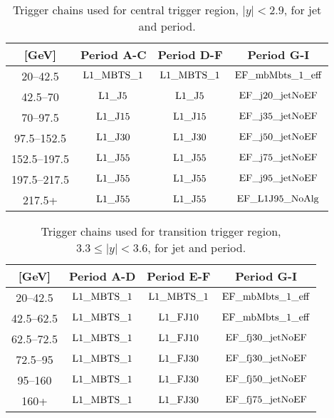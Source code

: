 \begin{table}[htdp]
\centering
\begin{tabular}{ | c | c | c | c | }
  \hline
 \pt{} [GeV] & Period A-C & Period D-F & Period G-I \\
  \hline
20--42.5 &  $ \rm L1\_ MBTS\_ 1$ & $ \rm L1\_ MBTS\_ 1$ & $ \rm EF\_ mbMbts\_ 1\_ eff$  \\
42.5--70 &  $ \rm L1\_ J5$ &     $ \rm L1\_ J5$ &     $ \rm EF\_ j20\_ jetNoEF$  \\
70--97.5 &   $ \rm L1\_ J15$ &    $ \rm L1\_ J15$ &    $ \rm EF\_ j35\_ jetNoEF$  \\
97.5--152.5 &   $ \rm L1\_ J30$ &    $ \rm L1\_ J30$ &    $ \rm EF\_ j50\_ jetNoEF$  \\
152.5--197.5 &  $ \rm L1\_ J55$ &    $ \rm L1\_ J55$ &    $ \rm EF\_ j75\_ jetNoEF$  \\
197.5--217.5 &  $ \rm L1\_ J55$ &    $ \rm L1\_ J55$ &    $ \rm EF\_ j95\_ jetNoEF$  \\
217.5+ &     $ \rm L1\_ J55$ &    $ \rm L1\_ J55$ &    $ \rm EF\_ L1J95\_ NoAlg$ \\

  \hline
\end{tabular}
\caption[Triggers used for jets in the central region]{
Trigger chains used for central trigger region, $|y|<2.9$, for jet \pt{} and period.
\label{tab:CentralTrigger}}
\end{table}%


\begin{table}[htdp]
\centering
\begin{tabular}{ | c | c | c | c | }
\hline
\pt{} [GeV] & Period A-D  & Period E-F & Period G-I \\
      \hline
         20--42.5 &     $ \rm L1\_ MBTS\_ 1$ & $ \rm L1\_ MBTS\_ 1$  &   $ \rm EF\_ mbMbts\_ 1\_ eff$  \\
         42.5--62.5 &   $ \rm L1\_ MBTS\_ 1$ & $ \rm L1\_ FJ10$      &   $ \rm EF\_ mbMbts\_ 1\_ eff$  \\
         62.5--72.5 &   $ \rm L1\_ MBTS\_ 1$ & $ \rm L1\_ FJ10$      &   $ \rm EF\_ fj30\_ jetNoEF$  \\
         72.5--95 &     $ \rm L1\_ MBTS\_ 1$ & $ \rm L1\_ FJ30$      &   $ \rm EF\_ fj30\_ jetNoEF$  \\
         95--160 &      $ \rm L1\_ MBTS\_ 1$ & $ \rm L1\_ FJ30$      &   $ \rm EF\_ fj50\_ jetNoEF$  \\
         160+ &         $ \rm L1\_ MBTS\_ 1$ & $ \rm L1\_ FJ30$      &   $ \rm EF\_ fj75\_ jetNoEF$  \\
         \hline
      \end{tabular}
\caption[Triggers used for jets in the transition region]{
      Trigger chains used for transition trigger region, $3.3\le|y|<3.6$, for jet \pt{} and period.
      \label{tab:TransTrigger}}
\end{table}%

